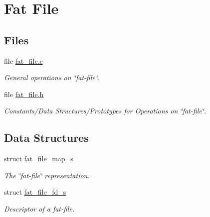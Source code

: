 \hypertarget{group__libfs__ff}{}\section{Fat File}
\label{group__libfs__ff}
\subsection*{Files}
\begin{DoxyCompactItemize}
\item 
file \mbox{\hyperlink{fat__file_8c}{fat\+\_\+file.\+c}}
\begin{DoxyCompactList}\small\item\em General operations on \char`\"{}fat-\/file\char`\"{}. \end{DoxyCompactList}\item 
file \mbox{\hyperlink{fat__file_8h}{fat\+\_\+file.\+h}}
\begin{DoxyCompactList}\small\item\em Constants/\+Data Structures/\+Prototypes for Operations on \char`\"{}fat-\/file\char`\"{}. \end{DoxyCompactList}\end{DoxyCompactItemize}
\subsection*{Data Structures}
\begin{DoxyCompactItemize}
\item 
struct \mbox{\hyperlink{structfat__file__map__s}{fat\+\_\+file\+\_\+map\+\_\+s}}
\begin{DoxyCompactList}\small\item\em The \char`\"{}fat-\/file\char`\"{} representation. \end{DoxyCompactList}\item 
struct \mbox{\hyperlink{structfat__file__fd__s}{fat\+\_\+file\+\_\+fd\+\_\+s}}
\begin{DoxyCompactList}\small\item\em Descriptor of a fat-\/file. \end{DoxyCompactList}\end{DoxyCompactItemize}
